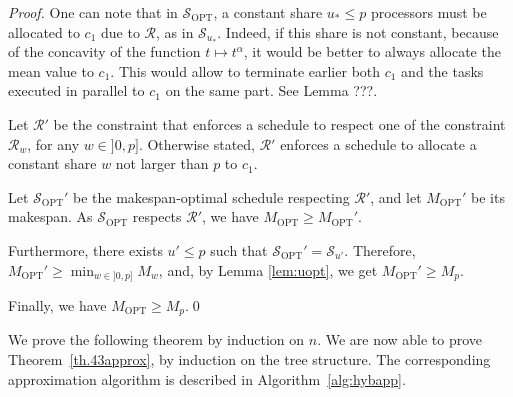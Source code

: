 \documentclass{llncs}
\newcommand{\s}{\mathcal S\xspace}
\newcommand{\sopt}{\ensuremath{\mathcal{S}_{\mathrm{OPT}}}\xspace}
\newcommand{\mopt}{\ensuremath{{M}_{\mathrm{OPT}}}\xspace}
\newcommand{\R}{\ensuremath{\mathcal{R}}\xspace}
\begin{document}
\begin{proof}
One can note that in $\sopt$, a constant share $u_*\leq p$ processors must be allocated to $c_1$ due to \R, as in $\s_{u_*}$. Indeed, if this share is not constant, because of the concavity of the function $t\mapsto t^\alpha$, it would be better to always allocate the mean value to $c_1$. This would allow to terminate earlier both $c_1$ and the tasks executed in parallel to $c_1$ on the same part. {\color{red} See Lemma ???.}
 
Let $\R'$ be the constraint that enforces a schedule to respect one of the constraint $\R_w$, for any $w\in]0,p]$. Otherwise stated, $\R'$ enforces a schedule to allocate a constant share $w$ not larger than $p$ to $c_1$.

Let $\sopt'$ be the makespan-optimal schedule respecting $\R'$, and let $\mopt'$ be its makespan. As $\sopt$ respects $\R'$, we have $\mopt\geq \mopt'$.

Furthermore, there exists $u'\leq p$ such that $\sopt'=\s_{u'}$. Therefore, $\mopt'\geq \min_{w\in]0,p]}M_{w}$, and, by Lemma \ref{lem:uopt}, we get $\mopt'\geq M_{p}$.

Finally, we have $\mopt\geq M_p$.\qed
\end{proof}




We prove the following theorem by induction on $n$.  We are now able
to prove Theorem~\ref{th.43approx}, by induction on the tree
structure. The corresponding approximation algorithm is described in
Algorithm~\ref{alg:hybapp}.
\end{document}
